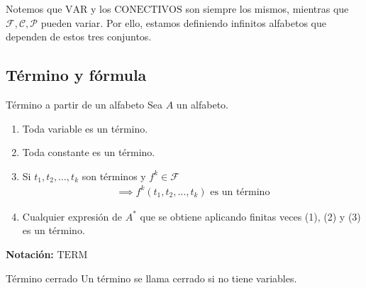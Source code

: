 Notemos que $\mathrm{VAR}$ y los $\mathrm{CONECTIVOS}$ son siempre los mismos, 
mientras que $\mathcal{F}, \mathcal{C}, \mathcal{P}$ pueden variar. Por ello,
estamos definiendo infinitos alfabetos que dependen de estos tres conjuntos.


\subsection{Término y fórmula}

\begin{definicion}{Término a partir de un alfabeto}{}
    Sea $A$ un alfabeto.

    \medskip

    \begin{enumerate}
        \item Toda variable es un término.
        \item Toda constante es un término.
        \item Si $t_1, t_2, \dotsc, t_k$ son términos y $f^k \in \mathcal{F}$
            \begin{gather*}
                \implies f^{k} (t_1,t_2,\dotsc,t_k) \text{ es un término}
            \end{gather*}
        \item Cualquier expresión de $A^{*}$ que se obtiene aplicando
            finitas veces (1), (2) y (3) es un término.
    \end{enumerate}
    
    \bigskip
    \textbf{Notación:}
    $ \mathrm{TERM}$
\end{definicion}

\medskip 

\begin{definicion}{Término cerrado}{}
    Un término se llama cerrado si no tiene variables.
\end{definicion}

\medskip 

